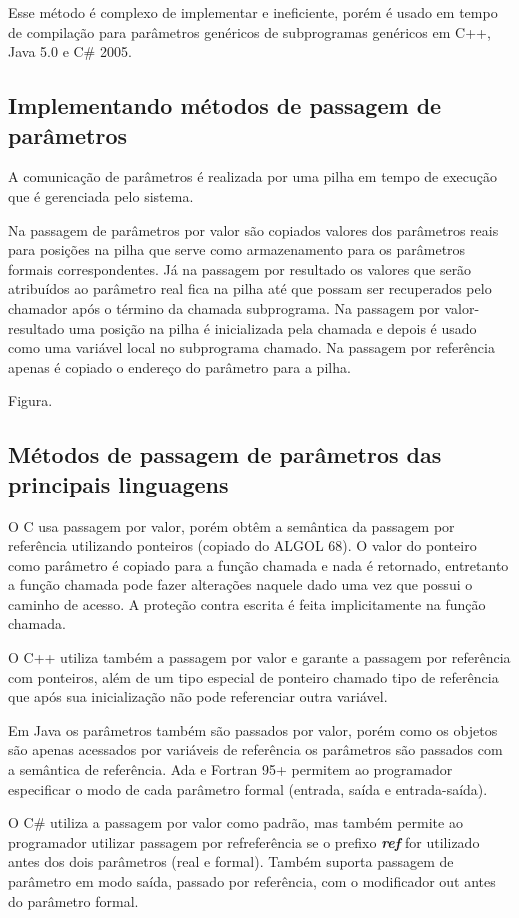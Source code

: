 Esse método é complexo de implementar e ineficiente, porém é usado em tempo de compilação para parâmetros genéricos de subprogramas genéricos em C++, Java 5.0 e C\# 2005.


\subsection{Implementando métodos de passagem de parâmetros}
A comunicação de parâmetros é realizada por uma pilha em tempo de execução que é gerenciada pelo sistema. 

Na passagem de parâmetros por valor são copiados valores dos parâmetros reais para posições na pilha que serve como armazenamento para os parâmetros formais correspondentes. Já na passagem por resultado os valores que serão atribuídos ao parâmetro real fica na pilha até que possam ser recuperados pelo chamador após o término da chamada subprograma. Na passagem por valor-resultado uma posição na pilha é inicializada pela chamada e depois é usado como uma variável local no subprograma chamado. Na passagem por referência apenas é copiado o endereço do parâmetro para a pilha.

Figura.

\subsection{Métodos de passagem de parâmetros das principais linguagens}
O C usa passagem por valor, porém obtêm a semântica da passagem por referência utilizando ponteiros (copiado do ALGOL 68). O valor do ponteiro como parâmetro é copiado para a função chamada e nada é retornado, entretanto a função chamada pode fazer alterações naquele dado uma vez que possui o caminho de acesso. A proteção contra escrita é feita implicitamente na função chamada. 

O C++ utiliza também a passagem por valor e garante a passagem por referência com ponteiros, além de um tipo especial de ponteiro chamado tipo de referência que após sua inicialização não pode referenciar outra variável.

Em Java os parâmetros também são passados por valor, porém como os objetos são apenas acessados por variáveis de referência os parâmetros são passados com a semântica de referência.
Ada e Fortran 95+ permitem ao programador especificar o modo de cada parâmetro formal (entrada, saída e entrada-saída).

O C\# utiliza a passagem por valor como padrão, mas também permite ao programador utilizar passagem por refreferência se o prefixo \textbf{\emph{ref}} for utilizado antes dos dois parâmetros (real e formal). Também suporta passagem de parâmetro em modo saída, passado por referência, com o modificador out antes do parâmetro formal.

